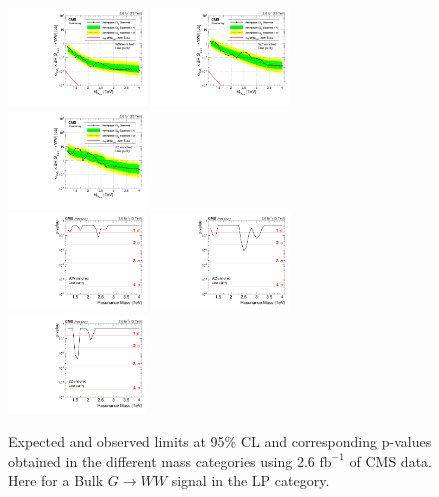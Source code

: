 \begin{figure}[h!]
\centering
\includegraphics[width=0.327\textwidth]{figures/analysis/search1/AN-15-211/limits/brazilianFlag_BulkWW_WWLP_13TeV_wPDF.pdf}
\includegraphics[width=0.327\textwidth]{figures/analysis/search1/AN-15-211/limits/brazilianFlag_BulkWW_WZLP_13TeV_wPDF.pdf}
\includegraphics[width=0.327\textwidth]{figures/analysis/search1/AN-15-211/limits/brazilianFlag_BulkWW_ZZLP_13TeV_wPDF.pdf}\\
\includegraphics[width=0.327\textwidth]{figures/analysis/search1/AN-15-211/pvalues/pvalue_BulkWWinWW_low_purity.pdf}
\includegraphics[width=0.327\textwidth]{figures/analysis/search1/AN-15-211/pvalues/pvalue_BulkWWinWZ_low_purity.pdf}
\includegraphics[width=0.327\textwidth]{figures/analysis/search1/AN-15-211/pvalues/pvalue_BulkWWinZZ_low_purity.pdf}
\caption{Expected and observed limits at 95\% CL and corresponding p-values obtained in the different mass categories using 2.6 $\textrm{fb}^{-1}$ of CMS data. Here for a Bulk $G\rightarrow WW$ signal in the LP category.}
\label{fig:app:Limits_LPBulkWW}
\end{figure}
